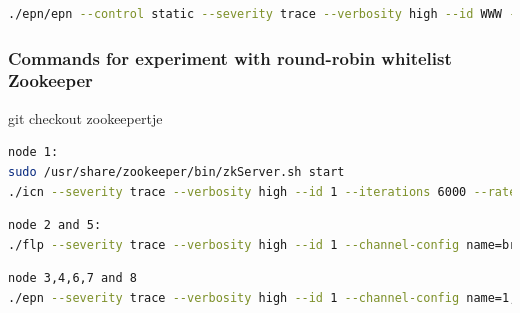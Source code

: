 \documentclass[]{article}
\begin{document}
\begin{lstlisting}[language=bash]
./epn/epn --control static --severity trace --verbosity high --id WWW --primary-interface eth0 --num-flp 2 --channel-config name=WWW,type=pull,method=bind,address=tcp://*:5555,rateLogging=1 name=feedback,type=push,method=connect,address=tcp://10.42.0.1:5000
\end{lstlisting}

\subsubsection{Commands for experiment with round-robin whitelist Zookeeper }
git checkout zookeepertje
\begin{lstlisting}[language=bash]
node 1:
sudo /usr/share/zookeeper/bin/zkServer.sh start
./icn --severity trace --verbosity high --id 1 --iterations 6000 --rate 200 --channel-config name=broadcast,type=pub,method=bind,rateLogging=0,address=tcp://*:5005
\end{lstlisting}

\begin{lstlisting}[language=bash]
node 2 and 5:
./flp --severity trace --verbosity high --id 1 --channel-config name=broadcast,type=sub,method=connect,rateLogging=1,address=tcp://<ip address of icn>:5005
\end{lstlisting}

\begin{lstlisting}[language=bash]
node 3,4,6,7 and 8
./epn --severity trace --verbosity high --id 1 --channel-config name=1,type=pull,method=bind,address=tcp://<own ip address>:5555,rateLogging=1
\end{lstlisting}
\end{document}
